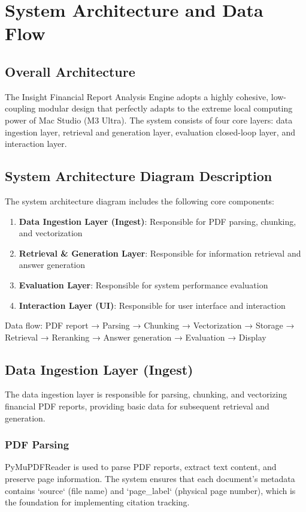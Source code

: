\section{System Architecture and Data Flow}

\subsection{Overall Architecture}

The Insight Financial Report Analysis Engine adopts a highly cohesive,
low-coupling modular design that perfectly adapts to the extreme local
computing power of Mac Studio (M3 Ultra). The system consists of four core
layers: data ingestion layer, retrieval and generation layer, evaluation
closed-loop layer, and interaction layer.

\subsection{System Architecture Diagram Description}

The system architecture diagram includes the following core components:

\begin{enumerate}
    \item \textbf{Data Ingestion Layer (Ingest)}: Responsible for PDF parsing, chunking, and vectorization
    \item \textbf{Retrieval \& Generation Layer}: Responsible for information retrieval and answer generation
    \item \textbf{Evaluation Layer}: Responsible for system performance evaluation
    \item \textbf{Interaction Layer (UI)}: Responsible for user interface and interaction
\end{enumerate}

Data flow: PDF report → Parsing → Chunking → Vectorization → Storage →
Retrieval → Reranking → Answer generation → Evaluation → Display

\subsection{Data Ingestion Layer (Ingest)}

The data ingestion layer is responsible for parsing, chunking, and vectorizing
financial PDF reports, providing basic data for subsequent retrieval and
generation.

\subsubsection{PDF Parsing}
PyMuPDFReader is used to parse PDF reports, extract text content, and preserve
page information. The system ensures that each document's metadata contains
`source` (file name) and `page\_label` (physical page number), which is the
foundation for implementing citation tracking.


